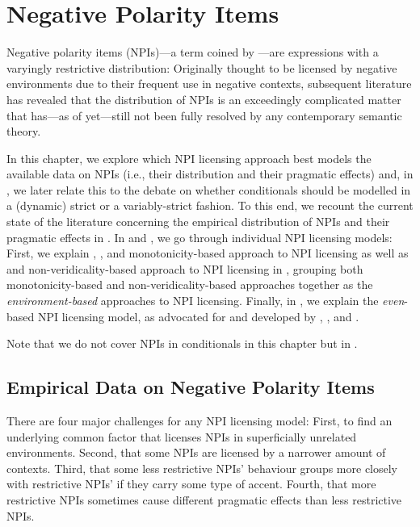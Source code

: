 \chapter{Negative Polarity Items}
Negative polarity items (NPIs)---a term coined by \textcite{Baker1969,Baker1970}---are expressions with a varyingly restrictive distribution: Originally thought to be licensed by negative environments \parencite{Jespersen1917,Klima1964,Baker1969,Baker1970} due to their frequent use in negative contexts, subsequent literature has revealed that the distribution of NPIs is an exceedingly complicated matter that has---as of yet---still not been fully resolved by any contemporary semantic theory.

In this chapter, we explore which NPI licensing approach best models the available data on NPIs (i.e., their distribution and their pragmatic effects) and, in , we later relate this to the debate on whether conditionals should be modelled in a (dynamic) strict or a variably-strict fashion. To this end, we recount the current state of the literature concerning the empirical distribution of NPIs and their pragmatic effects in . In  and , we go through individual NPI licensing models: First, we explain \textcite{Fauconnier1975a,Fauconnier1975b}, \textcite{Ladusaw1980}, and  monotonicity-based approach to NPI licensing as well as \textcite{Zwarts1995} and  non-veridicality-based approach to NPI licensing in , grouping both monotonicity-based and non-veridicality-based approaches together as the \textit{environment-based} approaches to NPI licensing. Finally, in , we explain the \textit{even}-based NPI licensing model, as advocated for and developed by \textcite{Lahiri1998}, \textcite{Crnic2011,Crnic2014-nm,Crnic2014-dogma}, and \textcite{Jeong2021,Jeong2022}.

Note that we do not cover NPIs in conditionals in this chapter but in .

\section{Empirical Data on Negative Polarity Items}
There are four major challenges for any NPI licensing model: First, to find an underlying common factor that licenses NPIs in superficially unrelated environments. Second, that some NPIs are licensed by a narrower amount of contexts. Third, that some less restrictive NPIs' behaviour groups more closely with restrictive NPIs' if they carry some type of accent. Fourth, that more restrictive NPIs sometimes cause different pragmatic effects than less restrictive NPIs.


